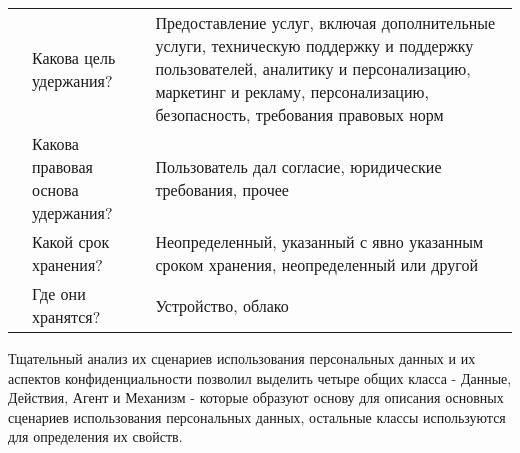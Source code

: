 \documentclass[../main]{subfiles}
\begin{document}
\begin{ltwrap}{2mm}{1.7}{\footnotesize}
\begin{longtable}[H]{|M{.20\x}|M{.30\x}|M{.50\x}|}
        
        & Какова цель удержания? 
        & Предоставление услуг, включая дополнительные услуги, техническую поддержку и поддержку пользователей, аналитику и персонализацию, маркетинг и рекламу, персонализацию, безопасность, требования правовых норм\\

        
        & Какова правовая основа удержания? 
        & Пользователь дал согласие, юридические требования, прочее\\

        
        & Какой срок хранения? 
        & Неопределенный, указанный с явно указанным сроком хранения, неопределенный или другой \\

        
        & Где они хранятся? 
        & Устройство, облако\\\hline
        
    \end{longtable}
\end{ltwrap}

Тщательный анализ их сценариев использования персональных данных и их аспектов конфиденциальности позволил выделить четыре общих класса - Данные, Действия, Агент и Механизм - которые образуют основу для описания основных сценариев использования персональных данных, остальные классы используются для определения их свойств.
\end{document}
